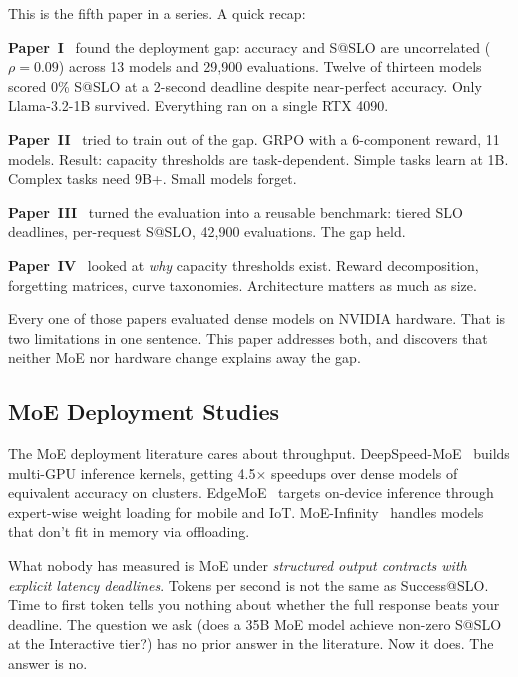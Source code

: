 \documentclass[11pt]{article}
\begin{document}
This is the fifth paper in a series.  A quick recap:

\textbf{Paper~I}~\citep{maloney2025deploymentgap} found the deployment gap: accuracy and S@SLO are uncorrelated ($\rho = 0.09$) across 13 models and 29,900 evaluations.  Twelve of thirteen models scored 0\% S@SLO at a 2-second deadline despite near-perfect accuracy.  Only Llama-3.2-1B survived.  Everything ran on a single RTX 4090.

\textbf{Paper~II}~\citep{maloney2025capacity} tried to train out of the gap.  GRPO with a 6-component reward, 11 models.  Result: capacity thresholds are task-dependent.  Simple tasks learn at 1B.  Complex tasks need 9B+.  Small models forget.

\textbf{Paper~III}~\citep{maloney2025agentslobench} turned the evaluation into a reusable benchmark: tiered SLO deadlines, per-request S@SLO, 42,900 evaluations.  The gap held.

\textbf{Paper~IV}~\citep{maloney2025dynamics} looked at \emph{why} capacity thresholds exist.  Reward decomposition, forgetting matrices, curve taxonomies.  Architecture matters as much as size.

Every one of those papers evaluated dense models on NVIDIA hardware.  That is two limitations in one sentence.  This paper addresses both, and discovers that neither MoE nor hardware change explains away the gap.

\subsection{MoE Deployment Studies}
\label{sec:moe-deployment-studies}

The MoE deployment literature cares about throughput.  DeepSpeed-MoE~\citep{rajbhandari2022deepspeedmoe} builds multi-GPU inference kernels, getting 4.5$\times$ speedups over dense models of equivalent accuracy on clusters.  EdgeMoE~\citep{yi2023edgemoe} targets on-device inference through expert-wise weight loading for mobile and IoT.  MoE-Infinity~\citep{xue2024moeinf} handles models that don't fit in memory via offloading.

What nobody has measured is MoE under \emph{structured output contracts with explicit latency deadlines}.  Tokens per second is not the same as Success@SLO.  Time to first token tells you nothing about whether the full response beats your deadline.  The question we ask (does a 35B MoE model achieve non-zero S@SLO at the Interactive tier?) has no prior answer in the literature.  Now it does.  The answer is no.
\end{document}

